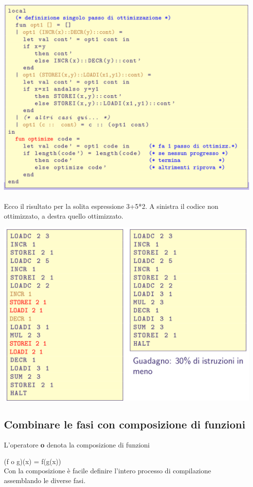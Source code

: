 \documentclass[10pt]{article}
\begin{document}
\includegraphics[scale=0.3]{Immagini/comp5.png}
\\\\
Ecco il risultato per la solita espressione 3+5*2. A sinistra il
codice non ottimizzato, a destra quello ottimizzato.

\includegraphics[scale=0.3]{Immagini/comp6.png}
\subsection{Combinare le fasi con composizione di funzioni}
L’operatore \textbf{o} denota la composizione di funzioni

(f o g)(x) = f(g(x))
\\
Con la composizione è facile definire l’intero processo di
compilazione assemblando le diverse fasi.
\end{document}
